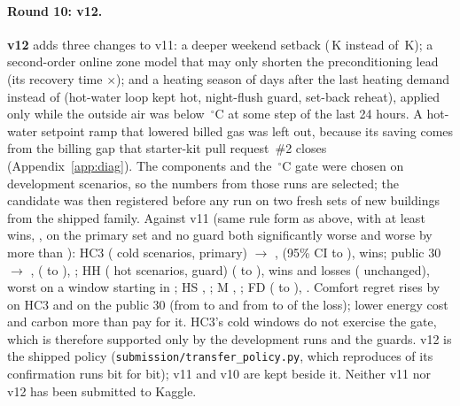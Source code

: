 \documentclass{article}
\begin{document}
\paragraph{Round 10: v12.}
\textbf{v12} adds three changes to v11: a deeper weekend setback (\RTenWkExtLo\,K instead of \RTenWkExtLoVEleven\,K);
a second-order online zone model that may only shorten the preconditioning lead (its recovery time
$\times$\RTenMprSafety); and a heating season of \RTenSeasonDays{} days after the last heating demand instead of
\RTenHeatSeasonDays{} (hot-water loop kept hot, night-flush guard, set-back reheat), applied only while the outside air
was below \RTenSeasonOatC\,$^\circ$C at some step of the last 24 hours. A hot-water setpoint ramp that lowered billed
gas was left out, because its saving comes from the billing gap that starter-kit pull request~\#2 closes
(Appendix~\ref{app:diag}). The components and the \RTenSeasonOatC\,$^\circ$C gate were chosen on development
scenarios, so the numbers from those runs are selected; the candidate was then registered before any run on two fresh
sets of \RTenNNewBuild{} new buildings from the shipped family. Against v11 (same rule form as above, with at least
\RTenRuleWins{} wins, \RTenRuleWinsPct, on the primary set and no guard both significantly worse and worse by more than
\RTenRuleMaterial): HC3 (\RTenConfHarshCThreeN{} cold scenarios, primary) \RTenConfHarshCThreeRef{} $\to$
\RTenConfHarshCThreeCand, \RTenConfHarshCThreeRel{} (95\% CI \RTenConfHarshCThreeRelLo{} to
\RTenConfHarshCThreeRelHi), \RTenConfHarshCThreeWins{} wins; public 30 \RTenConfPubRef{} $\to$ \RTenConfPubCand,
\RTenConfPubRel{} (\RTenConfPubRelLo{} to \RTenConfPubRelHi), \RTenConfPubWins; HH (\RTenConfHotHN{} hot scenarios,
guard) \RTenConfHotHRel{} (\RTenConfHotHRelLo{} to \RTenConfHotHRelHi), \RTenConfHotHWins{} wins and
\RTenConfHotHLosses{} losses (\RTenConfHotHTies{} unchanged), worst \RTenConfHotHWorstRel{} on a
\RTenConfHotHWorstStation{} window starting in \RTenConfHotHWorstMonth; HS \RTenConfHarshSRel, \RTenConfHarshSWins; M
\RTenConfMinnRel, \RTenConfMinnWins; FD \RTenConfFreshDefRel{} (\RTenConfFreshDefRelLo{} to \RTenConfFreshDefRelHi),
\RTenConfFreshDefWins. Comfort regret rises by \RTenComfRiseHCThree{} on HC3 and \RTenComfRisePub{} on the public 30
(from \RTenComfShareHCThreeRef{} to \RTenComfShareHCThreeCand{} and from \RTenComfSharePubRef{} to
\RTenComfSharePubCand{} of the loss); lower energy cost and carbon more than pay for it. HC3's cold windows do not
exercise the gate, which is therefore supported only by the development runs and the guards. v12 is the shipped policy
(\texttt{submission/transfer\_policy.py}, which reproduces \RTenXcheckN{} of its confirmation runs bit for bit); v11
and v10 are kept beside it. Neither v11 nor v12 has been submitted to Kaggle.
\end{document}
